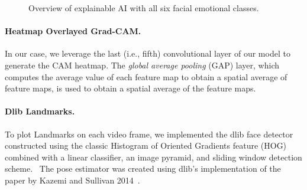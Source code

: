 \begin{figure}[ht]
  \caption{Overview of explainable AI with all six facial emotional classes.}
  \label{fig:xai}
\end{figure}

\paragraph{Heatmap Overlayed Grad-CAM.}
In our case, we leverage the last (i.e., fifth) convolutional layer of our model to generate the CAM heatmap. 
The \textit{global average pooling} (GAP) layer, 
which computes the average value of each feature map to obtain a spatial average of feature maps, 
is used to obtain a spatial average of the feature maps. 


\paragraph{Dlib Landmarks.} %
To plot Landmarks on each video frame, we implemented the dlib face detector %
constructed using the classic Histogram of Oriented Gradients feature (HOG)~\cite{1467360} combined with a linear classifier, 
an image pyramid, and sliding window detection scheme.~\cite{dlib_site}
The pose estimator was created using dlib's implementation of the paper by Kazemi and Sullivan 2014~\cite{6909637}.

